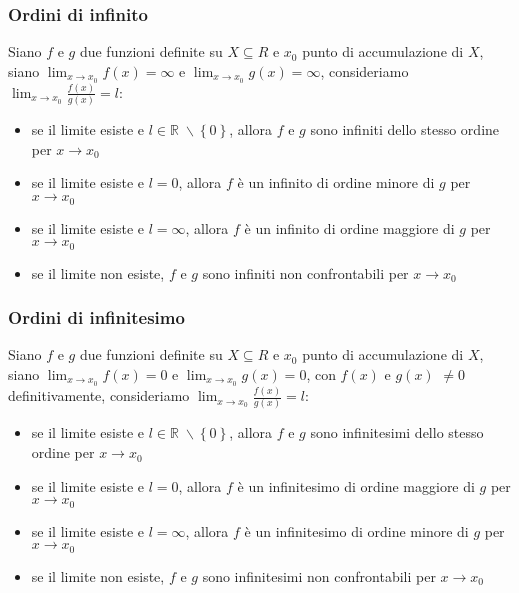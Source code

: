 \documentclass[a4paper]{article}
\begin{document}
\subsubsection*{Ordini di infinito}
Siano \(f\) e \(g\) due funzioni definite su \(X \subseteq R\) e \(x_0\) punto di accumulazione di \(X\), siano \(\displaystyle \lim_{x \to x_0} f(x) = \infty\)
e \(\displaystyle \lim_{x \to x_0} g(x) = \infty\), consideriamo \(\displaystyle \lim_{x \to x_0} \frac{f(x)}{g(x)} = l\):
\begin{itemize}
	\item se il limite esiste e \(l \in \mathbb{R} \; \backslash \left\{0\right\}\), allora \(f\) e \(g\) sono infiniti dello stesso ordine per \(x \to x_0\)
	\item se il limite esiste e \(l = 0\), allora \(f\) è un infinito di ordine minore di \(g\) per \(x \to x_0\)
	\item se il limite esiste e \(l = \infty\), allora \(f\) è un infinito di ordine maggiore di \(g\) per \(x \to x_0\)
	\item se il limite non esiste, \(f\) e \(g\) sono infiniti non confrontabili per \(x \to x_0\)
\end{itemize}

\subsubsection*{Ordini di infinitesimo}
Siano \(f\) e \(g\) due funzioni definite su \(X \subseteq R\) e \(x_0\) punto di accumulazione di \(X\), siano \(\displaystyle \lim_{x \to x_0} f(x) = 0\)
e \(\displaystyle \lim_{x \to x_0} g(x) = 0\), con \(f(x)\) e \(g(x)\) \(\neq 0\) definitivamente, consideriamo \(\displaystyle \lim_{x \to x_0} \frac{f(x)}{g(x)} = l\):
\begin{itemize}
	\item se il limite esiste e \(l \in \mathbb{R} \; \backslash \left\{0\right\}\), allora \(f\) e \(g\) sono infinitesimi dello stesso ordine per \(x \to x_0\)
	\item se il limite esiste e \(l = 0\), allora \(f\) è un infinitesimo di ordine maggiore di \(g\) per \(x \to x_0\)
	\item se il limite esiste e \(l = \infty\), allora \(f\) è un infinitesimo di ordine minore di \(g\) per \(x \to x_0\)
	\item se il limite non esiste, \(f\) e \(g\) sono infinitesimi non confrontabili per \(x \to x_0\)
\end{itemize}
\end{document}

